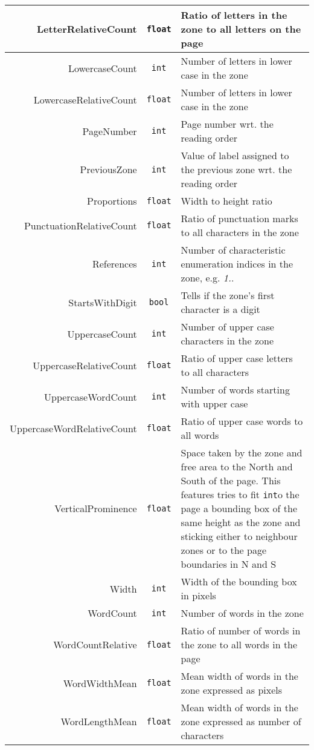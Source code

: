 \begin{appendix}
\begin{longtable}[c]{|r|c|p{8cm}|}
LetterRelativeCount & \verb+float+ & Ratio of letters in the zone to all letters on the page\\ \hline
LowercaseCount & \verb+int+ & Number of letters in lower case in the zone\\ \hline
LowercaseRelativeCount & \verb+float+ & Number of letters in lower case in the zone\\ \hline
PageNumber & \verb+int+ & Page number wrt. the reading order \\ \hline
PreviousZone & \verb+int+ & Value of label assigned to the previous zone wrt. the reading order\\ \hline
Proportions & \verb+float+ & Width to height ratio\\ \hline
PunctuationRelativeCount & \verb+float+ & Ratio of punctuation marks to all characters in the zone\\ \hline
References & \verb+int+ & Number of characteristic enumeration indices in the zone, e.g. \textit{1.}.\\ \hline
StartsWithDigit & \verb+bool+ & Tells if the zone's first character is a digit\\ \hline
UppercaseCount & \verb+int+ & Number of upper case characters in the zone \\ \hline
UppercaseRelativeCount & \verb+float+ & Ratio of upper case letters to all characters\\ \hline
UppercaseWordCount & \verb+int+ & Number of words starting with upper case\\ \hline
UppercaseWordRelativeCount & \verb+float+ & Ratio of upper case words to all words\\ \hline
VerticalProminence & \verb+float+ & Space taken by the zone and free area to the North and South of the page. This features tries to fit \verb+int+o the page a bounding box of the same height as the zone and sticking either to neighbour zones or to the page boundaries in N and S \\ \hline
Width & \verb+int+ & Width of the bounding box in pixels\\ \hline
WordCount & \verb+int+ & Number of words in the zone\\ \hline
WordCountRelative & \verb+float+ & Ratio of number of words in the zone to all words in the page\\ \hline
WordWidthMean & \verb+float+ & Mean width of words in the zone expressed as pixels\\ \hline
WordLengthMean & \verb+float+ & Mean width of words in the zone expressed as number of characters\\ \hline

\end{longtable}
\end{appendix}
